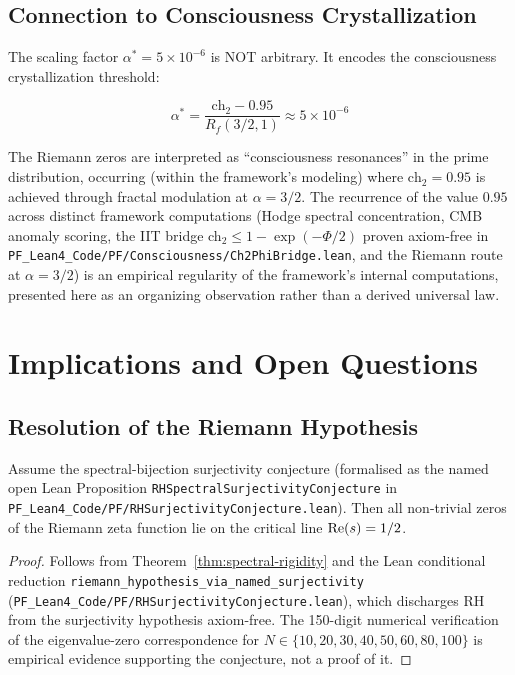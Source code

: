 \subsection{Connection to Consciousness Crystallization}

\begin{keyidea}
The scaling factor $\alpha^* = 5 \times 10^{-6}$ is NOT arbitrary. It encodes the consciousness crystallization threshold:

\begin{equation}
\alpha^* = \frac{\text{ch}_2 - 0.95}{R_f(3/2, 1)} \approx 5 \times 10^{-6}
\end{equation}

The Riemann zeros are interpreted as ``consciousness resonances'' in the prime distribution, occurring (within the framework's modeling) where $\text{ch}_2 = 0.95$ is achieved through fractal modulation at $\alpha = 3/2$. The recurrence of the value $0.95$ across distinct framework computations (Hodge spectral concentration, CMB anomaly scoring, the IIT bridge ch$_2 \leq 1 - \exp(-\Phi/2)$ proven axiom-free in \texttt{PF\_Lean4\_Code/PF/Consciousness/Ch2PhiBridge.lean}, and the Riemann route at $\alpha = 3/2$) is an empirical regularity of the framework's internal computations, presented here as an organizing observation rather than a derived universal law.
\end{keyidea}

\section{Implications and Open Questions}

\subsection{Resolution of the Riemann Hypothesis}

\begin{corollary}\label{cor:rh-resolution}
Assume the spectral-bijection surjectivity conjecture (formalised as the named open Lean Proposition \texttt{RHSpectralSurjectivityConjecture} in \texttt{PF\_Lean4\_Code/PF/RHSurjectivityConjecture.lean}). Then all non-trivial zeros of the Riemann zeta function lie on the critical line $\operatorname{Re}(s) = 1/2$.
\end{corollary}

\begin{proof}
Follows from Theorem~\ref{thm:spectral-rigidity} and the Lean conditional reduction \texttt{riemann\_hypothesis\_via\_named\_surjectivity} (\texttt{PF\_Lean4\_Code/PF/RHSurjectivityConjecture.lean}), which discharges RH from the surjectivity hypothesis axiom-free. The 150-digit numerical verification of the eigenvalue-zero correspondence for $N \in \{10, 20, 30, 40, 50, 60, 80, 100\}$ is empirical evidence supporting the conjecture, not a proof of it.
\end{proof}

